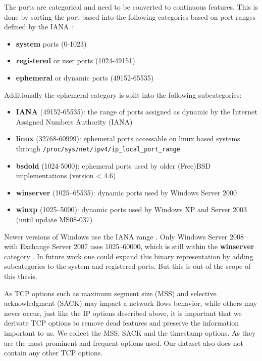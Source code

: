 \documentclass[
	ngerman,
	ruledheaders=section,%
	class=report,%
	thesis={type=bachelor},%
	accentcolor=9c,%
	custommargins=true,%
	marginpar=false,%
	parskip=half-,%
	fontsize=11pt,%
]{tudapub}
\let\code\texttt
\begin{document}
The ports are categorical and need to be converted to continuous features.
This is done by sorting the port based into the following categories based on port ranges defined by the IANA \cite{ServiceNameTransport}:
\begin{itemize}
    \item \textbf{system} ports (0-1023)
    \item \textbf{registered} or user ports (1024-49151)
    \item \textbf{ephemeral} or dynamic ports (49152-65535)
\end{itemize}
Additionally the ephemeral category is split into the following subcategories:
\begin{itemize}
    \item \textbf{IANA} (49152-65535): the range of ports assigned as dynamic by the Internet Assigned Numbers Authority (IANA) \cite{ServiceNameTransport}
    \item \textbf{linux} (32768-60999): ephemeral ports accessable on linux based systems through \code{/proc/sys/net/ipv4/ip\_local\_port\_range}
    \item \textbf{bsdold} (1024-5000): ephemeral ports used by older (Free)BSD implementations (version < 4.6) \cite{EphemeralPortRange}
    \item \textbf{winserver} (1025–65535): dynamic ports used by Windows Server 2000 \cite{DefaultDynamicPort} \cite{WhenYouTry}
    \item \textbf{winxp} (1025–5000): dynamic ports used by Windows XP \cite{CableGuyDecember} and Server 2003 (until update MS08-037) \cite{YouExperienceIssues}
\end{itemize}
Newer versions of Windows use the IANA range \cite{DefaultDynamicPort}.
Only Windows Server 2008 with Exchange Server 2007 uses 1025–60000, which is still within the \textbf{winserver} category \cite{DefaultDynamicPort}.
In future work one could expand this binary representation by adding subcategories to the system and registered ports.
But this is out of the scope of this thesis.

As TCP options such as maximum segment size (MSS) and selective acknowledgment (SACK) may impact a network flows behavior,
while others may never occur, just like the IP options described above,
it is important that we derivate TCP options to remove dead features and preserve the information important to us.
We collect the MSS, SACK and the timestamp options.
As they are the most prominent and frequent options used.
Our dataset also does not contain any other TCP options.
\end{document}
